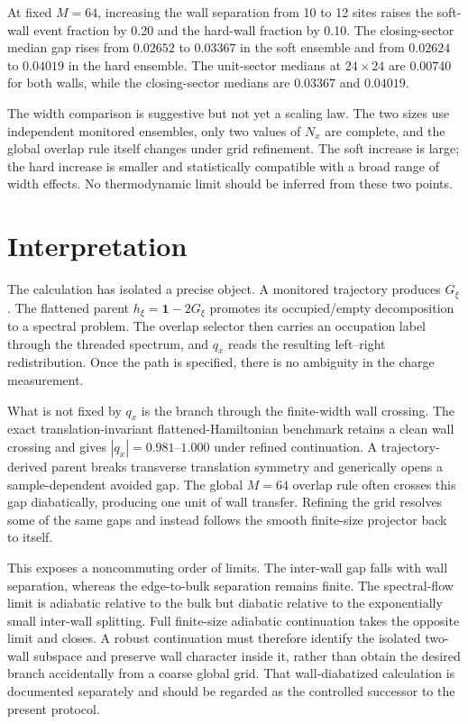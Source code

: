 \documentclass[aps,prb,twocolumn,floatfix,nofootinbib,superscriptaddress]{revtex4-2}
\begin{document}
At fixed $M=64$, increasing the wall separation from 10 to 12 sites raises
the soft-wall event fraction by 0.20 and the hard-wall fraction by 0.10.  The
closing-sector median gap rises from $0.02652$ to $0.03367$ in the soft
ensemble and from $0.02624$ to $0.04019$ in the hard ensemble.  The
unit-sector medians at
$24\times24$ are $0.00740$ for both walls, while the closing-sector medians are
$0.03367$ and $0.04019$.

The width comparison is suggestive but not yet a scaling law.  The two sizes
use independent monitored ensembles, only two values of $N_x$ are complete,
and the global overlap rule itself changes under grid refinement.  The soft
increase is large; the hard increase is smaller and statistically compatible
with a broad range of width effects.  No thermodynamic limit should be inferred
from these two points.

\section{Interpretation}

The calculation has isolated a precise object.  A monitored trajectory
produces $G_\xi$.  The flattened parent $h_\xi=\mathbf{1}-2G_\xi$ promotes its
occupied/empty decomposition to a spectral problem.  The overlap selector
then carries an occupation label through the threaded spectrum, and $q_x$
reads the resulting left--right redistribution.  Once the path is specified,
there is no ambiguity in the charge measurement.

What is not fixed by $q_x$ is the branch through the finite-width wall
crossing.  The exact translation-invariant flattened-Hamiltonian benchmark
retains a clean wall crossing and gives $|q_x|=0.981$--$1.000$ under refined
continuation.  A trajectory-derived parent breaks transverse translation
symmetry and generically opens a sample-dependent avoided gap.  The global
$M=64$ overlap rule often crosses this gap diabatically, producing one unit of
wall transfer.  Refining the grid resolves some of the same gaps and instead
follows the smooth finite-size projector back to itself.

This exposes a noncommuting order of limits.  The inter-wall gap falls with
wall separation, whereas the edge-to-bulk separation remains finite.  The
spectral-flow limit is adiabatic relative to the bulk but diabatic relative to
the exponentially small inter-wall splitting.  Full finite-size adiabatic
continuation takes the opposite limit and closes.  A robust continuation must
therefore identify the isolated two-wall subspace and preserve wall character
inside it, rather than obtain the desired branch accidentally from a coarse
global grid.  That wall-diabatized calculation is documented separately and
should be regarded as the controlled successor to the present protocol.
\end{document}
